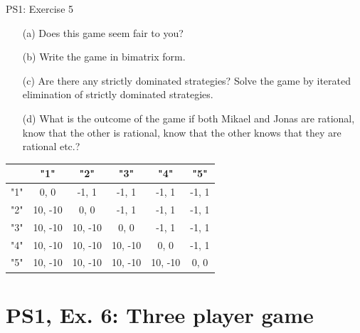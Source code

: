 \begin{frame}{PS1: Exercise 5}
\begin{multicols}{2}
  \begin{enumerate}
    \item[(a)] Does this game seem fair to you?
    \item[(b)] Write the game in bimatrix form.
    \item[(c)] Are there any strictly dominated strategies? Solve the game by iterated elimination of strictly dominated strategies.
    \item[(d)] What is the outcome of the game if both Mikael and Jonas are rational, know that the other is rational, know that the other knows that they are rational etc.?
  \end{enumerate}
\vfill\null
\columnbreak
\vfill\null
\begin{table}
  \footnotesize
  \begin{tabular}{c|c|c|c|c|c}
        & "1"     & "2"     & "3"     & "4"     & "5"     \\
    \midrule
    "1" & 0, 0    & -1, 1   & -1, 1   & -1, 1   & -1, 1   \\
    \midrule
    "2" & 10, -10 & 0, 0    & -1, 1   & -1, 1   & -1, 1   \\
    \midrule
    "3" & 10, -10 & 10, -10 & 0, 0    & -1, 1   & -1, 1   \\
    \midrule
    "4" & 10, -10 & 10, -10 & 10, -10 & 0, 0    & -1, 1   \\
    \midrule
    "5" & 10, -10 & 10, -10 & 10, -10 & 10, -10 & 0, 0    \\
  \end{tabular}
\end{table}
\end{multicols}
\end{frame}


\section{PS1, Ex. 6: Three player game}


